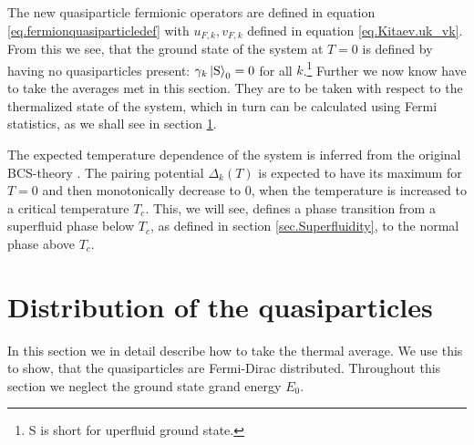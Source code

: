 The new quasiparticle fermionic operators are defined in equation \eqref{eq.fermionquasiparticledef} with $u_{F,k},v_{F,k}$ defined in equation \eqref{eq.Kitaev.uk_vk}. From this we see, that the ground state of the system at $T=0$ is defined by having no quasiparticles present: $\gamma_k \ket{\text{S}}_0 = 0$ for all $k$.\footnote{S is short for uperfluid ground state.} Further we now know have to take the averages met in this section. They are to be taken with respect to the thermalized state of the system, which in turn can be calculated using Fermi statistics, as we shall see in section \ref{sec.Distributionquasiparticles}.

The expected temperature dependence of the system is inferred from the original BCS-theory \cite[chapter 3]{Tinkham}. The pairing potential $\Delta_k(T)$ is expected to have its maximum for $T = 0$ and then monotonically decrease to 0, when the temperature is increased to a critical temperature $T_c$. This, we will see, defines a phase transition from a superfluid phase below $T_c$, as defined in section \ref{sec.Superfluidity}, to the normal phase above $T_c$.

\section{Distribution of the quasiparticles} \label{sec.Distributionquasiparticles}
In this section we in detail describe how to take the thermal average. We use this to show, that the quasiparticles are Fermi-Dirac distributed. Throughout this section we neglect the ground state grand energy $E_0$.

